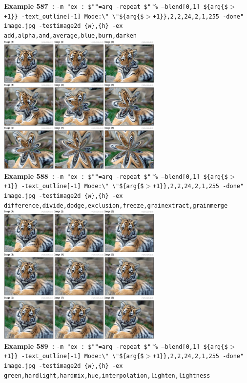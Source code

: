 \documentclass[a4paper,11pt,twoside]{book}
\begin{document}
\begin{center}
{\footnotesize \textbf{Example 587~:} \texttt{-m "ex : \$""=arg -repeat \$""\% --blend[0,1] \$\{arg\{\$$>$+1\}\} -text\_outline[-1] Mode:\textbackslash " \textbackslash "\$\{arg\{\$$>$+1\}\},2,2,24,2,1,255 -done" image.jpg -testimage2d \{w\},\{h\} -ex add,alpha,and,average,blue,burn,darken}}
\\\includegraphics[keepaspectratio=true,height=7cm,width=\textwidth]{img/gmic_def588.jpg}\\
{\footnotesize \textbf{Example 588~:} \texttt{-m "ex : \$""=arg -repeat \$""\% --blend[0,1] \$\{arg\{\$$>$+1\}\} -text\_outline[-1] Mode:\textbackslash " \textbackslash "\$\{arg\{\$$>$+1\}\},2,2,24,2,1,255 -done" image.jpg -testimage2d \{w\},\{h\} -ex difference,divide,dodge,exclusion,freeze,grainextract,grainmerge}}
\\\includegraphics[keepaspectratio=true,height=7cm,width=\textwidth]{img/gmic_def589.jpg}\\
{\footnotesize \textbf{Example 589~:} \texttt{-m "ex : \$""=arg -repeat \$""\% --blend[0,1] \$\{arg\{\$$>$+1\}\} -text\_outline[-1] Mode:\textbackslash " \textbackslash "\$\{arg\{\$$>$+1\}\},2,2,24,2,1,255 -done" image.jpg -testimage2d \{w\},\{h\} -ex green,hardlight,hardmix,hue,interpolation,lighten,lightness}}

\end{center}
\end{document}
